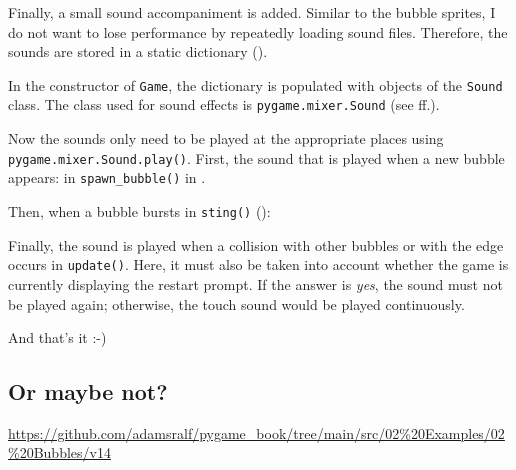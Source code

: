 Finally, a small sound accompaniment is added. Similar to the bubble sprites, I do not want to lose performance by repeatedly loading sound files. Therefore, the sounds are stored in a static dictionary ().


In the constructor of \texttt{Game}, the dictionary is populated with objects of the \texttt{Sound} class. The class used for sound effects is \texttt{pygame.mixer.Sound} (see  ff.).


Now the sounds only need to be played at the appropriate places using \texttt{pygame.mixer\-.Sound\-.play()}. First, the sound that is played when a new bubble appears: in \texttt{spawn\_\-bubb\-le()} in .


Then, when a bubble bursts in \texttt{sting()} ():


Finally, the sound is played when a collision with other bubbles or with the edge occurs in \texttt{update()}. Here, it must also be taken into account whether the game is currently displaying the restart prompt. If the answer is \emph{yes}, the sound must not be played again; otherwise, the touch sound would be played continuously.


And that’s it :-)

\subsection{Or maybe not?}
\begin{diskbox}
	\url{https://github.com/adamsralf/pygame_book/tree/main/src/02%20Examples/02%20Bubbles/v14}
\end{diskbox}


